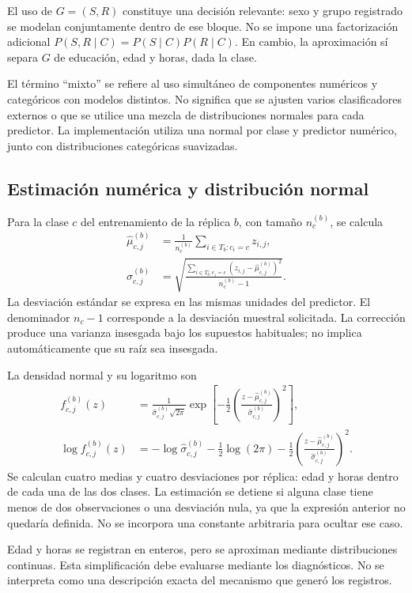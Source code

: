 \documentclass[11pt,a4paper]{article}
\begin{document}
El uso de $G=(S,R)$ constituye una decisión relevante: sexo y grupo registrado se modelan conjuntamente dentro de ese bloque. No se impone una factorización adicional $P(S,R\mid C)=P(S\mid C)P(R\mid C)$. En cambio, la aproximación sí separa $G$ de educación, edad y horas, dada la clase.

El término ``mixto'' se refiere al uso simultáneo de componentes numéricos y categóricos con modelos distintos. No significa que se ajusten varios clasificadores externos o que se utilice una mezcla de distribuciones normales para cada predictor. La implementación utiliza una normal por clase y predictor numérico, junto con distribuciones categóricas suavizadas.

\subsection{Estimación numérica y distribución normal}
Para la clase $c$ del entrenamiento de la réplica $b$, con tamaño $n_c^{(b)}$, se calcula
\begin{align}
\widehat\mu_{c,j}^{(b)}&=\frac{1}{n_c^{(b)}}\sum_{i\in T_b:c_i=c}z_{i,j},\\
\widehat\sigma_{c,j}^{(b)}&=\sqrt{\frac{\sum_{i\in T_b:c_i=c}(z_{i,j}-\widehat\mu_{c,j}^{(b)})^2}{n_c^{(b)}-1}}.
\end{align}
La desviación estándar se expresa en las mismas unidades del predictor. El denominador $n_c-1$ corresponde a la desviación muestral solicitada. La corrección produce una varianza insesgada bajo los supuestos habituales; no implica automáticamente que su raíz sea insesgada.

La densidad normal y su logaritmo son
\begin{align}
f_{c,j}^{(b)}(z)&=\frac{1}{\widehat\sigma_{c,j}^{(b)}\sqrt{2\pi}}\exp\left[-\frac12\left(\frac{z-\widehat\mu_{c,j}^{(b)}}{\widehat\sigma_{c,j}^{(b)}}\right)^2\right],\\
\log f_{c,j}^{(b)}(z)&=-\log\widehat\sigma_{c,j}^{(b)}-\tfrac12\log(2\pi)-\tfrac12\left(\frac{z-\widehat\mu_{c,j}^{(b)}}{\widehat\sigma_{c,j}^{(b)}}\right)^2.\label{eq:lognormal}
\end{align}
Se calculan cuatro medias y cuatro desviaciones por réplica: edad y horas dentro de cada una de las dos clases. La estimación se detiene si alguna clase tiene menos de dos observaciones o una desviación nula, ya que la expresión anterior no quedaría definida. No se incorpora una constante arbitraria para ocultar ese caso.

Edad y horas se registran en enteros, pero se aproximan mediante distribuciones continuas. Esta simplificación debe evaluarse mediante los diagnósticos. No se interpreta como una descripción exacta del mecanismo que generó los registros.
\end{document}
